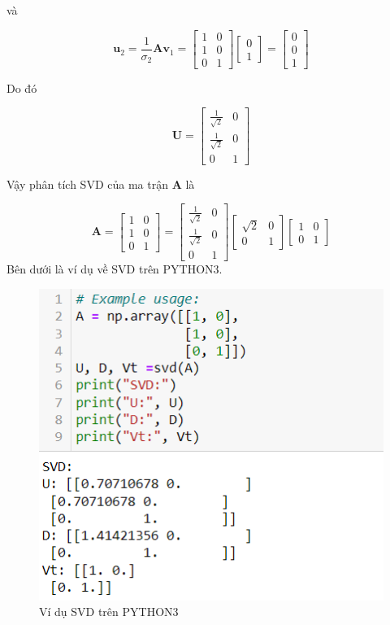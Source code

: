 \documentclass[14pt,oneside,a4paper]{report}
\numberwithin{equation}{section}
\begin{document}
và

$$
\mathbf{u}_{2}=\frac{1}{\sigma_{2}} \mathbf{A} \mathbf{v}_{1}=\left[\begin{array}{ll}
1 & 0 \\
1 & 0 \\
0 & 1
\end{array}\right]\left[\begin{array}{l}
0 \\
1
\end{array}\right]=\left[\begin{array}{l}
0 \\
0 \\
1
\end{array}\right]
$$

Do đó

$$
\mathbf{U}=\left[\begin{array}{cc}
\frac{1}{\sqrt{2}} & 0 \\
\frac{1}{\sqrt{2}} & 0 \\
0 & 1
\end{array}\right]
$$

Vậy phân tích SVD của ma trận $\mathbf{A}$ là

$$
\mathbf{A}=\left[\begin{array}{ll}
1 & 0 \\
1 & 0 \\
0 & 1
\end{array}\right]=\left[\begin{array}{cc}
\frac{1}{\sqrt{2}} & 0 \\
\frac{1}{\sqrt{2}} & 0 \\
0 & 1
\end{array}\right]\left[\begin{array}{cc}
\sqrt{2} & 0 \\
0 & 1
\end{array}\right]\left[\begin{array}{ll}
1 & 0 \\
0 & 1
\end{array}\right]
$$
Bên dưới là ví dụ về SVD trên PYTHON3.
\begin{figure}[htp]
\centering
\includegraphics[scale=0.9]{example_svd.png}
\caption{Ví dụ SVD trên PYTHON3}
\label{fig:galaxy}
\end{figure}
\end{document}
